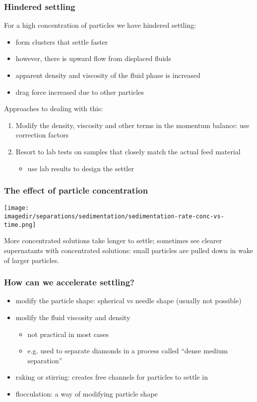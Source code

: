 \begin{frame}\frametitle{Hindered settling}
	For a high concentration of particles we have hindered settling:
	\begin{itemize}
		\item	form clusters that settle faster
		\item	however, there is upward flow from displaced fluids
		\item	apparent density and viscosity of the fluid phase is increased
		\item	drag force increased due to other particles
	\end{itemize}
	
	\vspace{12pt}
	Approaches to dealing with this:
	\begin{enumerate}
		\item	Modify the density, viscosity and other terms in the momentum balance: use correction factors
		\item	Resort to lab tests on samples that closely match the actual feed material
		\begin{itemize}
			\item	use lab results to design the settler
		\end{itemize}
	\end{enumerate}
\end{frame}

\begin{frame}\frametitle{The effect of particle concentration}
	\begin{center}
		\texttt{[image: \\imagedir/separations/sedimentation/sedimentation-rate-conc-vs-time.png]}
	\end{center}
	
	More concentrated solutions take longer to settle; sometimes see clearer supernatants with concentrated solutions: small particles are pulled down in wake of larger particles.
\end{frame}

\begin{frame}\frametitle{How can we accelerate settling?}
	\begin{itemize}
		\item	modify the particle shape: spherical vs needle shape (usually not possible)
		\item	modify the fluid viscosity and density 
		\begin{itemize}
			\item	not practical in most cases
			\item	e.g. used to separate diamonds in a process called ``dense medium separation''
		\end{itemize}
		\item	raking or stirring: creates free channels for particles to settle in
		\item	flocculation: a way of modifying particle shape
	\end{itemize}
\end{frame}

